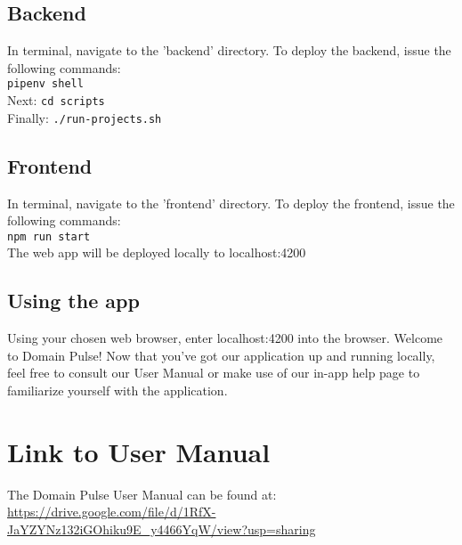 \documentclass[12pt]{article}
\begin{document}
\subsection{Backend}
In terminal, navigate to the 'backend' directory. To deploy the backend, issue the following commands:\\ \texttt{pipenv shell}
\\Next: \texttt{cd scripts}\\
Finally: \texttt{./run-projects.sh}\\

\subsection{Frontend}
In terminal, navigate to the 'frontend' directory. To deploy the frontend, issue the following commands:\\
\texttt{npm run start}\\
The web app will be deployed locally to localhost:4200

\subsection{Using the app}
Using your chosen web browser, enter localhost:4200 into the browser. Welcome to Domain Pulse! Now that you've got our application
up and running locally, feel free to consult our User Manual or make use of our in-app help page to familiarize yourself with the application.

\section{Link to User Manual}
The Domain Pulse User Manual can be found at: \url{https://drive.google.com/file/d/1RfX-JaYZYNz132iGOhiku9E_y4466YqW/view?usp=sharing}
\end{document}
